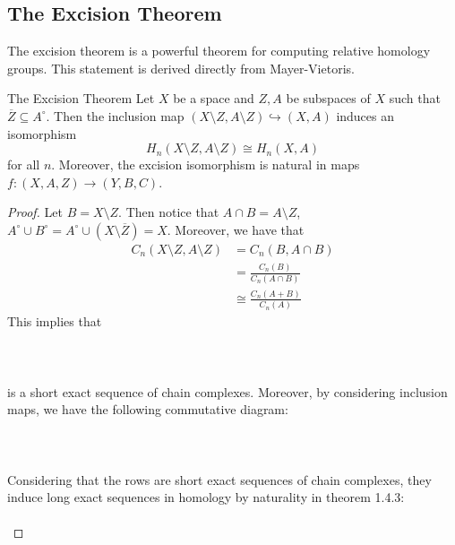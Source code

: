 \documentclass[a4paper]{article}
\begin{document}
\subsection{The Excision Theorem}
The excision theorem is a powerful theorem for computing relative homology groups. This statement is derived directly from Mayer-Vietoris. 

\begin{thm}{The Excision Theorem}{} Let $X$ be a space and $Z,A$ be subspaces of $X$ such that $\overline{Z}\subseteq A^\circ$. Then the inclusion map $(X\setminus Z,A\setminus Z)\hookrightarrow (X,A)$ induces an isomorphism $$H_n(X\setminus Z,A\setminus Z)\cong H_n(X,A)$$ for all $n$. Moreover, the excision isomorphism is natural in maps $f:(X,A,Z)\to(Y,B,C)$. \tcbline
\begin{proof}
Let $B=X\setminus Z$. Then notice that $A\cap B=A\setminus Z$, $A^\circ\cup B^\circ=A^\circ\cup(X\setminus\overline{Z})=X$. Moreover, we have that 
\begin{align*}
C_n(X\setminus Z,A\setminus Z)&=C_n(B,A\cap B)\\
&=\frac{C_n(B)}{C_n(A\cap B)}\tag{By definition}\\
&\cong\frac{C_n(A+B)}{C_n(A)}\tag{Second Isomorphism Theorem}
\end{align*}
This implies that \\~\\
\\~\\
is a short exact sequence of chain complexes. Moreover, by considering inclusion maps, we have the following commutative diagram: \\~\\
\\~\\
Considering that the rows are short exact sequences of chain complexes, they induce long exact sequences in homology by naturality in theorem 1.4.3: \\~\\

\end{proof}
\end{thm}
\end{document}
